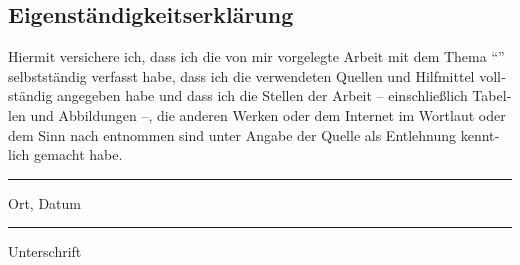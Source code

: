 
\begin{otherlanguage}{ngerman}
\chapter*{Eigenständigkeitserklärung}
Hiermit versichere ich, dass ich die von mir vorgelegte Arbeit mit dem Thema ``\MyTitle'' selbstständig verfasst habe, dass ich die verwendeten Quellen und Hilfmittel vollständig angegeben habe und dass ich die Stellen der Arbeit -- einschließlich Tabellen und Abbildungen --, die anderen Werken oder dem Internet im Wortlaut oder dem Sinn nach entnommen sind unter Angabe der Quelle als Entlehnung kenntlich gemacht habe.

\vspace{3cm}
\parbox{6cm}{\hrule
\strut Ort, Datum} \hfill\parbox{6cm}{\hrule
\strut Unterschrift}
\end{otherlanguage}
\thispagestyle{empty}
\clearpage